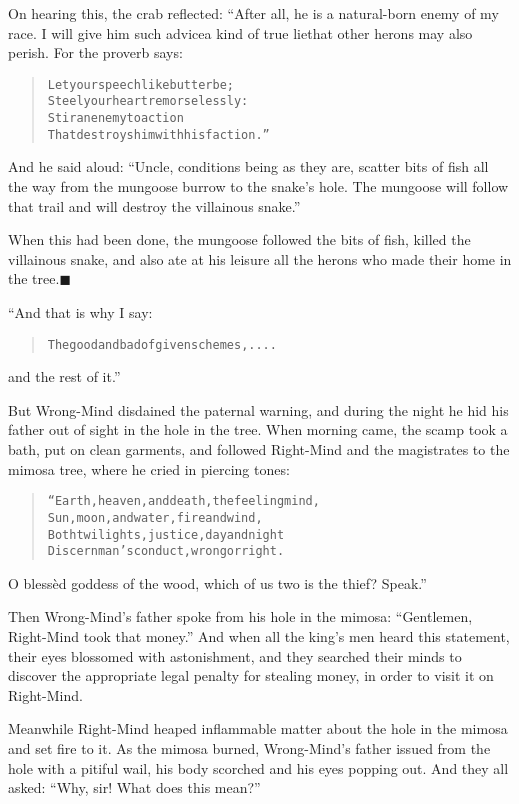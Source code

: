 \documentclass[article, twoside, 14pt]{memoir}
\newcommand{\qed}{\hfill \ensuremath{\blacksquare}}
\renewenvironment{verbatim}{%
\begin{quote}%
\vskip -10pt%
\begin{alltt}\normalfont\large}{\end{alltt}%
\end{quote}%
\vskip -10pt
} %
\begin{document}
On hearing this, the crab reflected: “After all, he is a
natural-born enemy of my race. I will give him such advice{\textemdash}a kind
of true lie{\textemdash}that other herons may also perish. For the proverb
says:

\begin{verbatim}
Let your speech like butter be;
Steel your heart remorselessly:
Stir an enemy to action
That destroys him with his faction.”
\end{verbatim}
And he said aloud:
``Uncle, conditions being as they are, scatter bits of fish all the way from the mungoose burrow to the snake's hole. The mungoose will follow that trail and will destroy the villainous snake.''

When this had been done, the mungoose followed the bits of fish,
killed the villainous snake, and also ate at his leisure all the
herons who made their home in the tree.\hyperref[s30]{\qed}

“And that is why I say:

\begin{verbatim}
The good and bad of given schemes, ....
\end{verbatim}
and the rest of it.”

But Wrong-Mind disdained the paternal warning, and during the night
he hid his father out of sight in the hole in the tree. When
morning came, the scamp took a bath, put on clean garments, and
followed Right-Mind and the magistrates to the mimosa tree, where
he cried in piercing tones:

\begin{verbatim}
“Earth, heaven, and death, the feeling mind,
Sun, moon, and water, fire and wind,
Both twilights, justice, day and night
Discern man's conduct, wrong or right.
\end{verbatim}
O blessèd goddess of the wood, which of us two is the thief?
Speak.”

Then Wrong-Mind's father spoke from his hole in the mimosa:
``Gentlemen, Right-Mind took that money.'' And when all the king's
men heard this statement, their eyes blossomed with
astonishment, and they searched their minds to discover the
appropriate legal penalty for stealing money, in order to visit it
on Right-Mind.

Meanwhile Right-Mind heaped inflammable matter about the hole in
the mimosa and set fire to it. As the mimosa burned, Wrong-Mind's
father issued from the hole with a pitiful wail, his body scorched
and his eyes popping out. And they all asked:
``Why, sir! What does this mean?''
\end{document}
